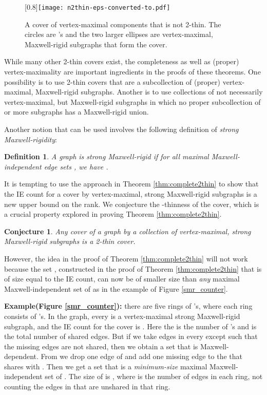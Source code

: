 \documentclass[10pt]{article}
\newtheorem{dfn}{Definition}
\newtheorem{conjecture}{Conjecture}
\begin{document}
\begin{center}
\begin{figure}[!h]
\begin{center}
\scalebox{0.8}[0.8]{\texttt{[image: n2thin-eps-converted-to.pdf]}}
\end{center}
\caption{A cover of vertex-maximal components that is not 2-thin. The circles are 's and the two larger ellipses are vertex-maximal, Maxwell-rigid subgraphs that form the cover.}
\label{fig:n2thin}
\end{figure}
\end{center}

\medskip\noindent
While many other 2-thin covers exist, the completeness as well as (proper) vertex-maximality
are important ingredients in the proofs of these theorems.
One possibility is to use 2-thin covers that are a subcollection of
(proper) vertex-maximal, Maxwell-rigid subgraphs. Another is to use collections of not necessarily vertex-maximal, but Maxwell-rigid subgraphs in which no proper subcollection of  or more subgraphs has a Maxwell-rigid union.


\medskip\noindent
Another notion that can be used involves the following definition of {\em strong Maxwell-rigidity}:
\begin{dfn}
A graph  is \emph{strong Maxwell-rigid} if for all maximal Maxwell-independent edge sets , we have .
\end{dfn}

It is tempting to use the approach in Theorem \ref{thm:complete2thin} to show that the IE count for a cover by vertex-maximal, strong Maxwell-rigid subgraphs is a new upper bound on the rank. We conjecture the -thinness of the cover, which is a crucial property explored in proving Theorem \ref{thm:complete2thin}.
\begin{conjecture}\label{conj:strong2co}
Any cover of a graph by a collection of vertex-maximal, strong Maxwell-rigid subgraphs is a 2-thin cover.
\end{conjecture}



\medskip\noindent
However, the idea in the proof of Theorem \ref{thm:complete2thin} will not work because the set , constructed in the proof of Theorem \ref{thm:complete2thin} that is of size equal to the IE count, can now be of smaller size than {\em any} maximal Maxwell-independent set of  as in the example of Figure \ref{smr_counter}.

\medskip\noindent
{\bf Example(Figure \ref{smr_counter}):} there are
five rings of 's, where each ring consists of  's. In the graph,
every  is a vertex-maximal strong Maxwell-rigid subgraph, and the
IE
count for the cover  is . Here the  is the number of 's and  is the total number of shared edges. But if we take 
edges in every  except  such that the missing edges are not shared, then we obtain a set  that is Maxwell-dependent. From  we drop one edge  of  and add one missing edge  to the  that shares  with . Then we get a set  that is a {\it minimum-size} maximal Maxwell-independent set of . The size of  is , where  is the number of edges in each ring, not counting the edges in  that are unshared in that ring. 
\end{document}

